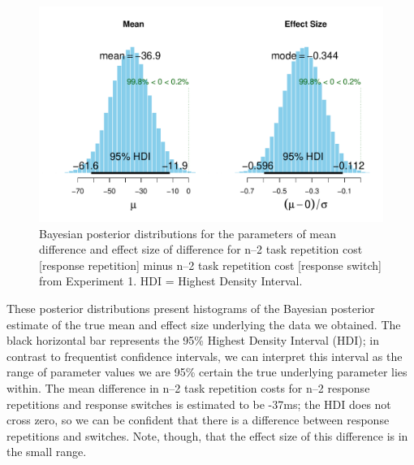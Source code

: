 \documentclass[a4paper, doc, natbib]{apa6}
\begin{document}
\begin{figure}
\begin{center}
\includegraphics[width = \textwidth]{Images/bayesParameter.pdf}
\caption{Bayesian posterior distributions for the parameters of mean difference and effect size of difference for n--2 task repetition cost [response repetition] minus n--2 task repetition cost [response switch] from Experiment 1. HDI = Highest Density Interval.}
\label{fig:bayesParameter}
\end{center}
\end{figure}

These posterior distributions present histograms of the Bayesian posterior estimate of the true mean and effect size underlying the data we obtained. The black horizontal bar represents the 95\% Highest Density Interval (HDI); in contrast to frequentist confidence intervals, we can interpret this interval as the range of parameter values we are 95\% certain the true underlying parameter lies within. The mean difference in n--2 task repetition costs for n--2 response repetitions and response switches is estimated to be -37ms; the HDI does not cross zero, so we can be confident that there is a difference between response repetitions and switches. Note, though, that the effect size of this difference is in the small range. 



\end{document}
